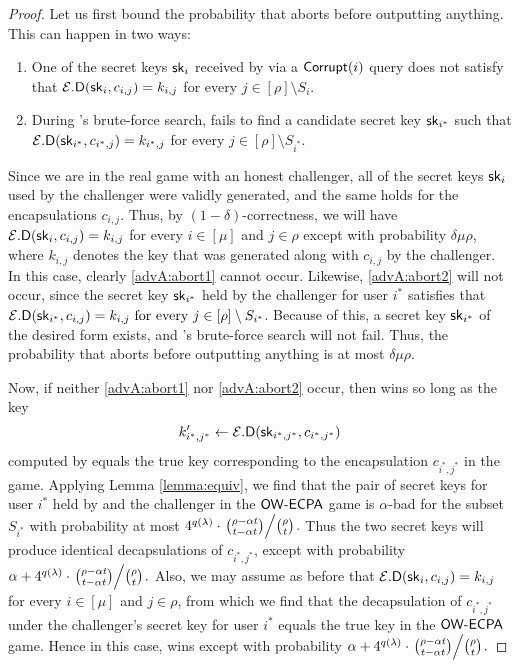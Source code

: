 \begin{proof}
  Let us first bound the probability that \advA aborts before outputting anything.
  This can happen in two ways:
  \begin{enumerate}
    \item\label{advA:abort1} One of the secret keys \(\mathsf{sk}_{i}\) received by \advA
          via a \(\mathsf{Corrupt}(i)\) query does not satisfy that \(\mathcal{E}.\mathsf{D}(\mathsf{sk}_{i}, c_{i,j}) = k_{i,j}\)
          for every \(j \in [\rho] \setminus S_{i}\).
    \item\label{advA:abort2} During \advA's brute-force search, \advA fails to find a candidate secret key \(\mathsf{sk}_{i^{*}}\)
          such that \(\mathcal{E}.\mathsf{D}(\mathsf{sk}_{i^{*}}, c_{i^{*},j}) = k_{i^{*},j}\) for every \(j \in [\rho] \setminus S_{i^{*}}\).
  \end{enumerate}
  Since we are in the real game with an honest challenger,
  all of the secret keys \(\mathsf{sk}_{i}\) used by the challenger
  were validly generated, and the same holds for the encapsulations \(c_{i,j}\).
  Thus, by \((1 - \delta)\)-correctness,
  we will have \(\mathcal{E}.\mathsf{D}(\mathsf{sk}_{i},c_{i,j}) = k_{i,j}\) for every \(i \in [\mu]\) and \(j \in \rho\)
  except with probability \(\delta \mu \rho\),
  where \(k_{i,j}\) denotes the key that was generated along with \(c_{i,j}\) by the challenger.
  In this case, clearly \ref{advA:abort1} cannot occur.
  Likewise, \ref{advA:abort2} will not occur,
  since the secret key \(\mathsf{sk}_{i^{*}}\) held by the challenger for user \(i^{*}\)
  satisfies that \(\mathcal{E}.\mathsf{D}(\mathsf{sk}_{i^{*}}, c_{i,j}) = k_{i,j} \text{ for every } j \in [\rho] \setminus S_{i^{*}}\).
  Because of this, a secret key \(\mathsf{sk}_{i^{*}}\) of the desired form exists,
  and \advA's brute-force search will not fail.
  Thus, the probability that \advA aborts before outputting anything is at most \(\delta \mu \rho\).

  Now, if neither \ref{advA:abort1} nor \ref{advA:abort2} occur,
  then \advA wins so long as the key
  \[
  k_{i^{*},j^{*}}' \leftarrow \mathcal{E}.\mathsf{D}(\mathsf{sk}_{i^{*},j^{*}}, c_{i^{*},j^{*}})
  \]
  computed by \advA equals the true key corresponding to the encapsulation \(c_{i^{*},j^{*}}\) in the game.
  Applying Lemma \ref{lemma:equiv},
  we find that the pair of secret keys for user \(i^{*}\) held by \advA
  and the challenger in the \(\mathsf{OW}\text{-}\mathsf{ECPA}\) game is
  \(\alpha\)-bad for the subset \(S_{i^{*}}\) with probability at most
  \(
    4^{q(\lambda)} \cdot \left. \binom{\rho - \alpha t}{t - \alpha t} \middle/ \binom{\rho}{t} \right..
  \)
  Thus the two secret keys will produce identical decapsulations of \(c_{i^{*},j^{*}}\), except with probability
  \(
    \alpha +
  4^{q(\lambda)} \cdot \left. \binom{\rho - \alpha t}{t - \alpha t} \middle/ \binom{\rho}{t} \right..
  \)
  Also, we may assume as before that
  \(\mathcal{E}.\mathsf{D}(\mathsf{sk}_{i},c_{i,j}) = k_{i,j}\) for every \(i \in [\mu]\) and \(j \in \rho\),
  from which we find that the decapsulation of \(c_{i^{*},j^{*}}\)
  under the challenger's secret key for user \(i^{*}\)
  equals the true key in the \(\mathsf{OW}\text{-}\mathsf{ECPA}\) game.
  Hence in this case, \advA wins except with probability
  \(
  \alpha
  + 4^{q(\lambda)} \cdot \left. \binom{\rho - \alpha t}{t - \alpha t} \middle/ \binom{\rho}{t} \right..
  \)


\end{proof}
